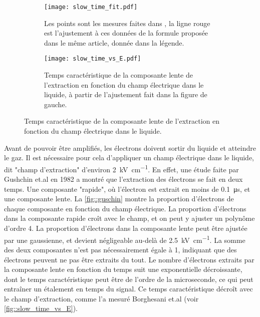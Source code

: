       \begin{figure}[htbp]
        \begin{subfigure}[t]{0.5\textwidth}
          \flushleft
          \captionsetup{width=.95\linewidth}
          \texttt{[image: slow\_time\_fit.pdf]}
          \caption{Les points sont les mesures faites dans \cite{Borghesani1990}, la ligne rouge est l'ajustement à ces données de la formule proposée dans le même article, donnée dans la légende.}
        \end{subfigure}
        \begin{subfigure}[t]{0.5\textwidth}
          \flushright        
          \captionsetup{width=.95\linewidth}
          \texttt{[image: slow\_time\_vs\_E.pdf]}
          \caption{Temps caractéristique de la composante lente de l'extraction en fonction du champ électrique dans le liquide, à partir de l'ajustement fait dans la figure de gauche.}
        \end{subfigure}
        \caption[Temps caractéristique de la composante lente de l'extraction en fonction du champ électrique.]{\label{fig::slow_time_vs_E}Temps caractéristique de la composante lente de l'extraction en fonction du champ électrique dans le liquide.}
      \end{figure}

      Avant de pouvoir être amplifiés, les électrons doivent sortir du liquide et atteindre le gaz. Il est nécessaire pour cela d'appliquer un champ électrique dans le liquide, dit "champ d'extraction" d'environ \SI{2}{\kilo\volt\per\centi\meter}. En effet, une étude faite par Gushchin et.al en 1982\cite{guschin} a montré que l'extraction des électrons se fait en deux temps. Une composante "rapide", où l'électron est extrait en moins de \SI{0.1}{\micro\second}, et une composante lente.  La \autoref{fig::guschin} montre la proportion d'électrons de chaque composante en fonction du champ électrique. La proportion d'électrons dans la composante rapide croît avec le champ, et on peut y ajuster un polynôme d'ordre 4. La proportion d'électrons dans la composante lente peut être ajustée par une gaussienne, et devient négligeable au-delà de \SI{2.5}{\kilo\volt\per\centi\meter}. La somme des deux composantes n'est pas nécessairement égale à 1, indiquant que des électrons peuvent ne pas être extraits du tout. Le nombre d'électrons extraits par la composante lente en fonction du temps suit une exponentielle décroissante, dont le temps caractéristique peut être de l'ordre de la microseconde\cite{Borghesani1990}, ce qui peut entraîner un étalement en temps du signal. Ce temps caractéristique décroît avec le champ d'extraction, comme l'a mesuré Borghesani et.al\cite{Borghesani1990} (voir \autoref{fig::slow_time_vs_E}). %

